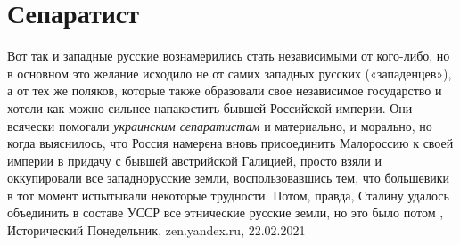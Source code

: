  
 
 
 
 
\chapter{Сепаратист}
\label{sec:slova.separatist}

Вот так и западные русские вознамерились стать независимыми от кого-либо, но в
основном это желание исходило не от самих западных русских («западенцев»), а от
тех же поляков, которые также образовали свое независимое государство и хотели
как можно сильнее напакостить бывшей Российской империи. Они всячески помогали
\emph{украинским сепаратистам} и материально, и морально, но когда выяснилось, что
Россия намерена вновь присоединить Малороссию к своей империи в придачу с
бывшей австрийской Галицией, просто взяли и оккупировали все западнорусские
земли, воспользовавшись тем, что большевики в тот момент испытывали некоторые
трудности. Потом, правда, Сталину удалось объединить в составе УССР все
этнические русские земли, но это было потом
, 
Исторический Понедельник, zen.yandex.ru, 22.02.2021 

